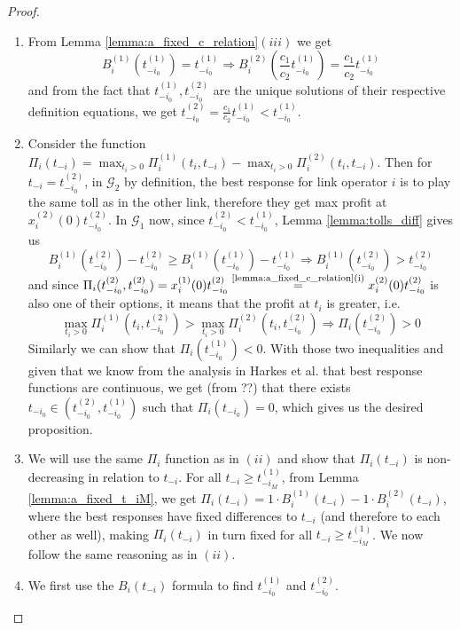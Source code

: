 \documentclass[10pt,a4paper]{book}
\newcommand{\indeq}[1]{\stackrel{\text{#1}}{=}}
\newcommand{\Gm}{\mathcal{G}}
\theoremstyle{definition}
\theoremstyle{comment}
\begin{document}
\begin{proof}
	$ $
	\begin{enumerate}[$(i)$]
		\item From Lemma \ref{lemma:a_fixed_c_relation}$(iii)$ we get
		\[
			B_i^{(1)}(t_{-i_0}^{(1)}) = t_{-i_0}^{(1)} \Rightarrow B_i^{(2)}\left(\frac{c_1}{c_2} t_{-i_0}^{(1)}\right) = \frac{c_1}{c_2} t_{-i_0}^{(1)}
		\]
		and from the fact that $t_{-i_0}^{(1)}, t_{-i_0}^{(2)}$ are the unique solutions of their respective definition equations, we get $t_{-i_0}^{(2)} = \frac{c_1}{c_2} t_{-i_0}^{(1)} < t_{-i_0}^{(1)}$.
		\item Consider the function $\Pi_i(t_{-i}) = \max_{t_i > 0}\Pi_i^{(1)}(t_i, t_{-i}) - \max_{t_i > 0}\Pi_i^{(2)}(t_i, t_{-i})$.
		Then for $t_{-i} = t_{-i_0}^{(2)}$, in $\Gm_2$ by definition, the best response for link operator $i$ is to play the same toll as in the other link, therefore they get max profit at $x_i^{(2)}(0) t_{-i_0}^{(2)}$.
		In $\Gm_1$ now, since $t_{-i_0}^{(2)} < t_{-i_0}^{(1)}$, Lemma \ref{lemma:tolls_diff} gives us
		\[
			B_i^{(1)}(t_{-i_0}^{(2)}) - t_{-i_0}^{(2)} \ge B_i^{(1)}(t_{-i_0}^{(1)}) - t_{-i_0}^{(1)} \Rightarrow B_i^{(1)}(t_{-i_0}^{(2)}) > t_{-i_0}^{(2)}
		\]
		and since $\Pi_i(t_{-i_0}^{(2)}, t_{-i_0}^{(2)}) = x_i^{(1)}(0) t_{-i_0}^{(2)} \indeq{\textrm{\ref{lemma:a_fixed_c_relation}}(i)} x_i^{(2)}(0) t_{-i_0}^{(2)}$ is also one of their options, it means that the profit at $t_i$ is greater, i.e.
		\[
			\max_{t_i > 0}\Pi_i^{(1)}(t_i, t_{-i_0}^{(2)}) > \max_{t_i > 0}\Pi_i^{(2)}(t_i, t_{-i_0}^{(2)}) \Rightarrow \Pi_i(t_{-i_0}^{(2)}) > 0
		\]
		Similarly we can show that $\Pi_i(t_{-i_0}^{(1)}) < 0$.
		With those two inequalities and given that we know from the analysis in Harkes et al. \cite{Harks_2019} that best response functions are continuous, we get (from ??) that there exists $t_{-i_0} \in \left(t_{-i_0}^{(2)}, t_{-i_0}^{(1)}\right)$ such that $\Pi_i(t_{-i_0}) = 0$, which gives us the desired proposition.
		\item We will use the same $\Pi_i$ function as in $(ii)$ and show that $\Pi_i(t_{-i})$ is non-decreasing in relation to $t_{-i}$.
		For all $t_{-i} \ge t_{-i_M}^{(1)}$, from Lemma \ref{lemma:a_fixed_t_iM}, we get $\Pi_i(t_{-i}) = 1 \cdot B_i^{(1)}(t_{-i}) - 1 \cdot B_i^{(2)}(t_{-i})$, where the best responses have fixed differences to $t_{-i}$ (and therefore to each other as well), making $\Pi_i(t_{-i})$ in turn fixed for all $t_{-i} \ge t_{-i_M}^{(1)}$.
		We now follow the same reasoning as in $(ii)$.
		\item We first use the $B_i(t_{-i})$ formula to find $t_{-i_0}^{(1)}$ and $t_{-i_0}^{(2)}$.

\end{enumerate}
\end{proof}
\end{document}
